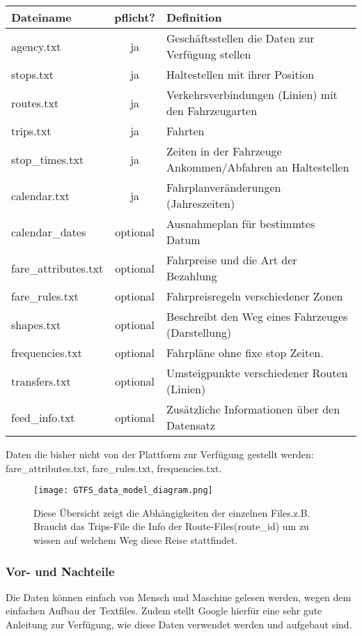 \begin{tabular}{|l|c|l|}  \hline
	Dateiname & pflicht? & Definition \\ \hline
	agency.txt & ja & Geschäftsstellen die Daten zur Verfügung stellen \\ \hline
	stops.txt & ja & Haltestellen mit ihrer Position \\ \hline
	routes.txt & ja & Verkehrsverbindungen (Linien) mit den Fahrzeugarten \\ \hline %
	trips.txt & ja & Fahrten  \\ \hline												%
	stop\_times.txt & ja & Zeiten in der Fahrzeuge Ankommen/Abfahren an Haltestellen \\ \hline
	calendar.txt & ja & Fahrplanveränderungen (Jahreszeiten) \\ \hline
	calendar\_dates & optional & Ausnahmeplan für bestimmtes Datum \\ \hline
	fare\_attributes.txt & optional & Fahrpreise und die Art der Bezahlung \\ \hline
	fare\_rules.txt & optional & Fahrpreisregeln verschiedener Zonen  \\ \hline
	shapes.txt & optional & Beschreibt den Weg eines Fahrzeuges (Darstellung) \\ \hline
	frequencies.txt & optional & Fahrpläne ohne fixe stop Zeiten. \\ \hline
	transfers.txt & optional & Umsteigpunkte verschiedener Routen (Linien) \\ \hline
	feed\_info.txt & optional & Zusätzliche Informationen über den Datensatz \\ \hline	
\end{tabular}
\cite{gtfsInhalt}
Daten die bisher nicht von der Plattform zur Verfügung gestellt werden: fare\_attributes.txt, fare\_rules.txt, frequencies.txt. 

\begin{figure}[]
	\centering
	\texttt{[image: GTFS\_data\_model\_diagram.png]}
 	\caption{Diese Übersicht zeigt die Abhängigkeiten der einzelnen Files.z.B. Braucht das Trips-File die Info der Route-Files(route\_id) um zu wissen auf welchem Weg diese Reise stattfindet.  \cite{gtfsUebersicht}}
	\label{fig:gtfs-uebersicht}
\end{figure}

 

\subsubsection{Vor- und Nachteile}
\label{sec:gtfs-vornachteile}
Die Daten können einfach von Mensch und Maschine gelesen werden, wegen dem einfachen Aufbau der Textfiles. Zudem stellt Google hierfür eine sehr gute Anleitung zur Verfügung, wie diese Daten verwendet werden und aufgebaut sind.


